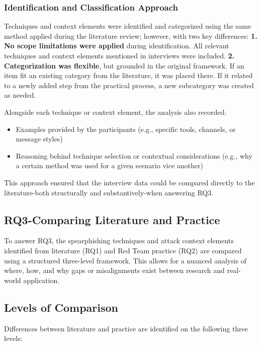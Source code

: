 \subsubsection{Identification and Classification Approach}
Techniques and context elements were identified and categorized using the same method applied during the literature review; however, with two key differences:
\textbf{1. No scope limitations were applied} during identification. All relevant techniques and context elements mentioned in interviews were included.
\textbf{2. Categorization was flexible}, but grounded in the original framework. If an item fit an existing category from the literature, it was placed there. If it related to a newly added step from the practical process, a new subcategory was created as needed.

Alongside each technique or context element, the analysis also recorded:
\begin{itemize}
    \item Examples provided by the participants (e.g., specific tools, channels, or message styles)
    \item Reasoning behind technique selection or contextual considerations (e.g., why a certain method was used for a given scenario vice another)
\end{itemize}

This approach ensured that the interview data could be compared directly to the literature-both structurally and substantively-when answering RQ3.

\subsection{RQ3-Comparing Literature and Practice}
To answer RQ3, the spearphishing techniques and attack context elements identified from literature (RQ1) and Red Team practice (RQ2) are compared using a structured three-level framework. This allows for a nuanced analysis of where, how, and why gaps or misalignments exist between research and real-world application.

\subsection{Levels of Comparison}
Differences between literature and practice are identified on the following three levels:


